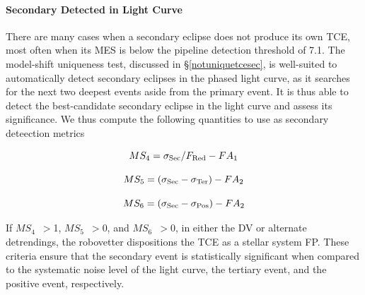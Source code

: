 \paragraph{Secondary Detected in Light Curve}
\label{secdetectsec}

There are many cases when a secondary eclipse does not produce its own TCE, most often when its MES is below the \kepler{} pipeline detection threshold of 7.1. The model-shift uniqueness test, discussed in \S\ref{notuniquetcesec}, is well-suited to automatically detect secondary eclipses in the phased light curve, as it searches for the next two deepest events aside from the primary event. It is thus able to detect the best-candidate secondary eclipse in the light curve and assess its significance. We thus compute the following quantities to use as secondary deteection metrics

\begin{equation}
    MS_{4} = \sigma_{\rm Sec}/F_{\rm Red} - FA_{1}
\end{equation}

\begin{equation}
    MS_{5} = (\sigma_{\rm Sec} - \sigma_{\rm Ter}) - FA_{2}
\end{equation}

\begin{equation}
    MS_{6} = (\sigma_{\rm Sec} - \sigma_{\rm Pos}) - FA_{2}
\end{equation}

If $MS_{4}$~$>$1, $MS_{5}$~$>$0, and $MS_{6}$~$>$0, in either the DV or alternate detrendings, the robovetter dispositions the TCE as a stellar system FP. These criteria ensure that the secondary event is statistically significant when compared to the systematic noise level of the light curve, the tertiary event, and the positive event, respectively.

